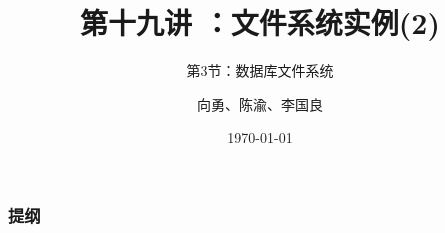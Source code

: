 


\title[第19讲]{第十九讲 ：文件系统实例(2)} %
\subtitle{第3节：数据库文件系统}
\author{向勇、陈渝、李国良} %
\date{\today} %

\usepackage[absolute,overlay]{textpos}



\begin{frame}
\titlepage %
\end{frame}

\begin{frame}
\frametitle{提纲} %
\tableofcontents %

\end{frame}
% 
% 
% 
% 
